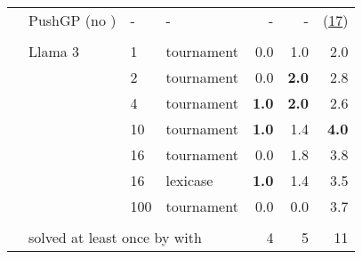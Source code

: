 \begin{table}[b]
\begin{adjustbox}{max width=.92\textwidth}
\begin{DIFnomarkup}
\begin{tabular}{llllrrr}
\cline{2-7}\\[-8pt]
   &  PushGP (no \method{}) & -   &    -            &       - &        - &      (\underline{17})\\[1pt]
\cline{2-7}\\[-8pt]
        & Llama 3 & 1   &         tournament &     0.0 &      1.0 &       2.0 \\
       &        & 2   &         tournament &     0.0 &      \textbf{2.0} &       2.8 \\
       &        & 4   &         tournament &     \textbf{1.0} &     \textbf{ 2.0} &       2.6 \\
       &        & 10  &         tournament &     \textbf{1.0} &      1.4 &       \textbf{4.0} \\
       &        & 16  &         tournament &     0.0 &      1.8 &       3.8 \\
       &        & 16  &           lexicase &    \textbf{ 1.0} &      1.4 &       3.5 \\
       &        & 100 &         tournament &     0.0 &      0.0 &       3.7 \\[1pt]
\cline{3-7}\\[-8pt]
       & \multicolumn{3}{l}{solved at least once by \method{} with \llama{}}  & 4 &        5 &       11  \\
\bottomrule
\end{tabular}
\end{DIFnomarkup} %
\end{adjustbox}
\end{table}



